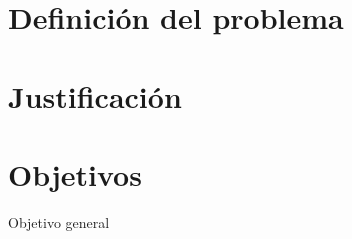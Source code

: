 \documentclass[12pt,openany]{book}
\begin{document}
\tableofcontents 
\makeatletter
\def\thickhrulefill{\leavevmode \leaders \hrule height 1ex \hfill \kern \z@}
\def\@makechapterhead#1{%
  \vspace*{10\p@}%
  {\parindent \z@ \centering \reset@font
        \thickhrulefill\quad
        \scshape \@chapapp{} \thechapter
        \quad \thickhrulefill
        \par\nobreak
        \vspace*{10\p@}%
        \interlinepenalty\@M
        \hrule
        \vspace*{10\p@}%
        \Huge \bfseries #1\par\nobreak
        \par
        \vspace*{10\p@}%
        \hrule
    \vskip 40\p@
  }}
\def\@makeschapterhead#1{%
  \vspace*{10\p@}%
  {\parindent \z@ \centering \reset@font
        \thickhrulefill
        \par\nobreak
        \vspace*{10\p@}%
        \interlinepenalty\@M
        \hrule
        \vspace*{10\p@}%
        \Huge \bfseries #1\par\nobreak
        \par
        \vspace*{10\p@}%
        \hrule
    \vskip 40\p@
  }}

\newpage
{} \setcounter{page}{1}

\chapter{Definición del problema}


\chapter{Justificación}


\chapter{Objetivos}
\vspace{5 cm}
\Large{Objetivo general}
\end{document}
